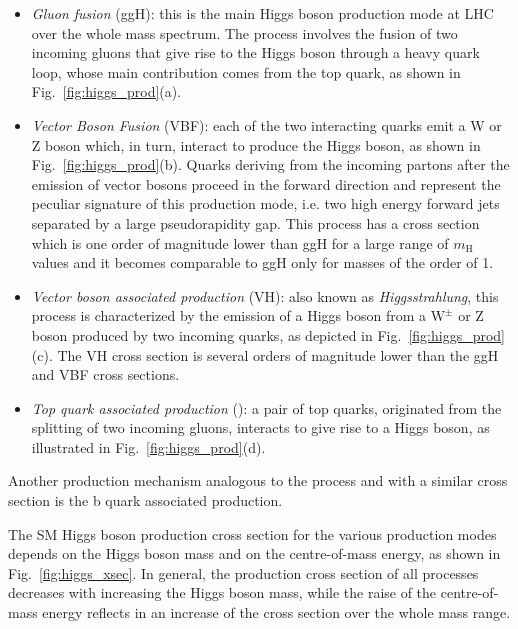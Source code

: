 \begin{itemize}
\item \emph{Gluon fusion} (ggH): this is the main Higgs boson production mode at LHC over the whole mass spectrum. The process involves the fusion of two incoming gluons that give rise to the Higgs boson through a heavy quark loop, whose main contribution comes from the top quark, as shown in Fig.~\ref{fig:higgs_prod}(a).

\item \emph{Vector Boson Fusion} (VBF): each of the two interacting quarks emit a W or Z boson which, in turn, interact to produce the Higgs boson, as shown in Fig.~\ref{fig:higgs_prod}(b). Quarks deriving from the incoming partons after the emission of vector bosons proceed in the forward direction and represent the peculiar signature of this production mode, i.e. two high energy forward jets separated by a large pseudorapidity gap. This process has a cross section which is one order of magnitude lower than ggH for a large range of $m_\mathrm{H}$ values and it becomes comparable to ggH only for masses of the order of 1\TeV.

\item \emph{Vector boson associated production} (VH): also known as \emph{Higgsstrahlung}, this process is characterized by the emission of a Higgs boson from a $\mathrm{W}^\pm$ or Z boson produced by two incoming quarks, as depicted in Fig.~\ref{fig:higgs_prod}(c). The VH cross section is several orders of magnitude lower than the ggH and VBF cross sections.

\item \emph{Top quark associated production} (\ttH): a pair of top quarks, originated from the splitting of two incoming gluons, interacts to give rise to a Higgs boson, as illustrated in Fig.~\ref{fig:higgs_prod}(d).
\end{itemize}

Another production mechanism analogous to the \ttH process and with a similar cross section is the b quark associated production.

The SM Higgs boson production cross section for the various production modes depends on the Higgs boson mass and on the centre-of-mass energy, as shown in Fig.~\ref{fig:higgs_xsec}. In general, the production cross section of all processes decreases with increasing the Higgs boson mass, while the raise of the centre-of-mass energy reflects in an increase of the cross section over the whole mass range.

